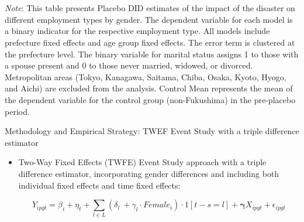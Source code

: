 \documentclass[serif, aspectratio=169]{beamer}
\begin{document}
\begin{frame}[label=different_types_placebo]
\begin{table}[htbp]
\\\\{\linewidth}{\tiny \textit{Note}: This table presents Placebo DID estimates of the impact of the disaster on different employment types by gender. The dependent variable for each model is a binary indicator for the respective employment type. All models include prefecture fixed effects and age group fixed effects. The error term is clustered at the prefecture level. The binary variable for marital status assigns 1 to those with a spouse present and 0 to those never married, widowed, or divorced. Metropolitan areas (Tokyo, Kanagawa, Saitama, Chiba, Osaka, Kyoto, Hyogo, and Aichi) are excluded from the analysis. Control Mean represents the mean of the dependent variable for the control group (non-Fukushima) in the pre-placebo period.}
\end{table}

\end{frame}



\begin{frame}{Methodology and Empirical Strategy: TWEF Event Study with a triple difference estimator}
    \begin{itemize}
    \item Two-Way Fixed Effects (TWFE) Event Study approach with a triple difference estimator, incorporating gender differences and including both individual fixed effects and time fixed effects:

\begin{equation}
Y_{ipgt} = \beta_i + \eta_t + \sum_{l \in L} (\delta_l\ + \gamma_l \cdot Female_i) \cdot 1[t-s = l] +  \mathbf \gamma {X}_{ipgt}+\epsilon_{ipgt}
\end{equation}
\end{itemize}

\end{frame}

\end{document}
